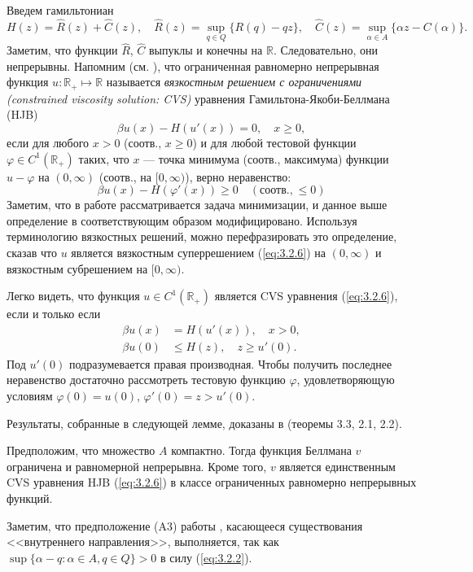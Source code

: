 Введем гамильтониан
\begin{equation} \label{eq:3.2.5}
H(z)=\widehat R(z)+\widehat C(z),\quad \widehat R(z)=\sup_{q\in Q}\{R(q)-qz\},\quad
\widehat C(z)=\sup_{\alpha\in A}\{\alpha z-C(\alpha)\}.
\end{equation}
Заметим, что функции $\widehat R$, $\widehat C$ выпуклы и конечны на $\mathbb R$. Следовательно, они непрерывны. Напомним (см. \cite{Son86}), что ограниченная равномерно непрерывная функция $u:\mathbb R_+\mapsto\mathbb R$ называется \emph{вязкостным решением с ограничениями (constrained viscosity solution: CVS)}  уравнения Гамильтона-Якоби-Беллмана (HJB)
\begin{equation} \label{eq:3.2.6}
 \beta u(x)-H(u'(x))=0,\quad x\ge 0,
\end{equation}
если для любого $x>0$ (соотв., $x\ge 0$) и для любой тестовой функции $\varphi\in C^1(\mathbb R_+)$ таких, что $x$ --- точка минимума (соотв., максимума) функции $u-\varphi$ на $(0,\infty)$ (соотв., на $[0,\infty)$), верно неравенство:
$$  \beta u(x)-H(\varphi'(x))\ge 0 \quad (\text{соотв.,}\ \le 0)$$
Заметим, что в работе \cite{Son86} рассматривается задача минимизации, и данное выше определение в соответствующим образом модифицировано. Используя терминологию вязкостных решений, можно перефразировать это определение, сказав что $u$ является вязкостным суперрешением (\ref{eq:3.2.6}) на $(0,\infty)$ и вязкостным субрешением на $[0,\infty)$.

Легко видеть, что функция $u\in C^1(\mathbb R_+)$ является CVS уравнения (\ref{eq:3.2.6}), если и только если
\begin{align}
\beta u(x)&=H(u'(x)),\quad x>0, \label{eq:3.2.7}\\
 \beta u(0)&\le H(z),\quad z\ge u'(0). \label{eq:3.2.8}
\end{align}
Под $u'(0)$ подразумевается правая производная. Чтобы получить последнее неравенство достаточно рассмотреть тестовую функцию $\varphi$, удовлетворяющую условиям $\varphi(0)=u(0)$, $\varphi'(0)=z>u'(0)$.

Результаты, собранные в следующей лемме, доказаны в \cite{Son86} (теоремы 3.3, 2.1, 2.2).
\begin{lemma} \label{lem:3.1}
Предположим, что множество $A$ компактно. Тогда функция Беллмана $v$ ограничена и равномерной непрерывна. Кроме того, $v$ является единственным CVS уравнения HJB (\ref{eq:3.2.6}) в классе ограниченных равномерно непрерывных функций.
\end{lemma}
Заметим, что предположение (A3) работы \cite{Son86}, касающееся существования <<внутреннего направления>>, выполняется, так как $\sup\{\alpha-q:\alpha\in A, q\in Q\}>0$ в силу (\ref{eq:3.2.2}).

